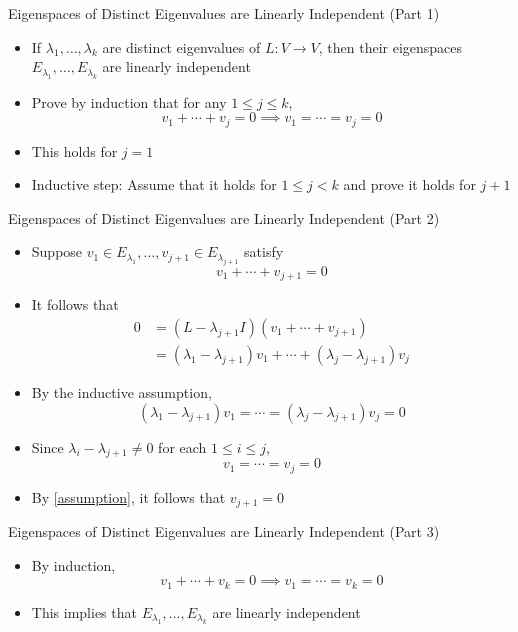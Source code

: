 \documentclass[usenames,dvipsnames,10pt]{beamer}
\begin{document}
\begin{frame}
  {Eigenspaces of Distinct Eigenvalues are Linearly Independent (Part 1)}

  \begin{itemize}
  \item If $\lambda_1, \dots, \lambda_k$ are distinct eigenvalues of $L: V \rightarrow V$, then their eigenspaces $E_{\lambda_1}, \dots, E_{\lambda_k}$ are linearly independent
  \item Prove by induction that for any $1 \le j \le k$,
    \[
      v_1 + \cdots + v_j = 0 \implies v_1=\cdots = v_j = 0
    \]
  \item This holds for $j=1$
  \item Inductive step: Assume that it holds for $1 \le j < k$ and prove it holds for $j+1$
  \end{itemize}
\end{frame}

\begin{frame}
  {Eigenspaces of Distinct Eigenvalues are Linearly Independent (Part 2)}

  \begin{itemize}
  \item Suppose $v_1 \in E_{\lambda_1}, \dots, v_{j+1}\in E_{\lambda_{j+1}}$ satisfy
    \begin{equation}\label{assumption}
      v_1 + \cdots + v_{j+1} = 0
    \end{equation}
  \item It follows that
    \begin{align*}
      0 &= (L-\lambda_{j+1}I)(v_1 + \cdots + v_{j+1})\\
        &= (\lambda_1-\lambda_{j+1})v_1 + \cdots + (\lambda_j-\lambda_{j+1})v_j
    \end{align*}
  \item By the inductive assumption,
    \[ (\lambda_1-\lambda_{j+1})v_1=\cdots=(\lambda_j-\lambda_{j+1})v_j=0 \]
  \item Since $\lambda_i-\lambda_{j+1}\ne 0$ for each $1 \le i \le j$,
    \[ v_1 = \cdots = v_j = 0 \]
  \item By \eqref{assumption}, it follows that $v_{j+1}=0$
  \end{itemize}
\end{frame}

\begin{frame}
  {Eigenspaces of Distinct Eigenvalues are Linearly Independent (Part 3)}

  \begin{itemize}
  \item By induction,
    \[ 
      v_1 + \cdots + v_k = 0 \implies v_1=\cdots = v_k = 0
    \]
  \item This implies that $E_{\lambda_1}, \dots, E_{\lambda_k}$ are linearly independent
  \end{itemize}
\end{frame}
\end{document}
